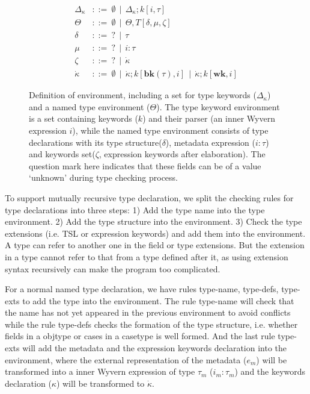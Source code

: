 \documentclass{sig-alternate}
\begin{document}
\begin{figure}[ht]
\begin{align*}
  \Delta_{\kappa} &::=~ \emptyset ~~ | ~~ \Delta_{\kappa};k[i,\tau]\\
  \Theta &::=~ \emptyset ~~ | ~~ \Theta,T[\delta,\mu,\zeta] \\
  \delta &::=~ ? ~~ | ~~ \tau\\
  \mu    &::=~ ? ~~ | ~~ i:\tau\\
  \zeta  &::=~ ? ~~ | ~~ \dot\kappa\\
  \dot\kappa        &::=~ \emptyset ~~ | ~~ \dot\kappa;k[\mathbf{bk}(\tau),i] ~~ | ~~ \dot\kappa;k[\mathbf{wk},i]
\end{align*}
\vspace{-8px}
\caption{Definition of environment, including a set for type keywords ($\Delta_{\kappa}$) and a named type environment ($\Theta$). The type keyword environment is a set containing keywords ($k$) and their parser (an inner Wyvern expression $i$), while the named type environment consists of type declarations with its type structure($\delta$), metadata expression ($i:\tau$) and keywords set($\zeta$, expression keywords after elaboration). The question mark here indicates that these fields can be of a value `unknown' during type checking process.}
\vspace{-10px}
\label{typechecking-environment}
\end{figure}

To support mutually recursive type declaration, we split the checking rules for type declarations into three steps: 1) Add the type name into the type environment. 2) Add the type structure into the environment. 3) Check the type extensions (i.e. TSL or expression keywords) and add them into the environment. A type can refer to another one in the field or type extensions. But the extension in a type cannot refer to that from a type defined after it, as using extension syntax recursively can make the program too complicated.

For a normal named type declaration, we have rules type-name, type-defs, type-exts to add the type into the environment. The rule type-name will check that the name has not yet appeared in the previous environment to avoid conflicts while the rule type-defs checks the formation of the type structure, i.e. whether fields in a objtype or cases in a casetype is well formed. And the last rule type-exts will add the metadata and the expression keywords declaration into the environment, where the external representation of the metadata ($e_m$) will be transformed into a inner Wyvern expression of type $\tau_m$ ($i_m:\tau_m$) and the keywords declaration ($\kappa$) will be transformed to $\dot\kappa$. 
\end{document}

